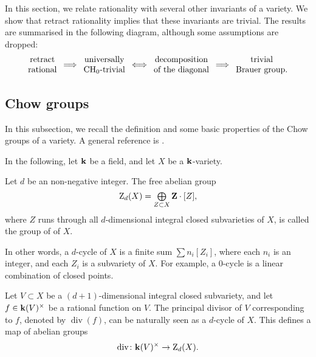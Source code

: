 In this section, we relate
rationality with several other invariants of a variety.
We show that retract rationality implies that 
these invariants are trivial. 
The results are summarised in the following diagram,
although some assumptions are dropped:
\[
    \begin{array}{c}
        \text{retract} \\
        \text{rational}
    \end{array}
    \Longrightarrow
    \begin{array}{c}
        \text{universally} \\
        \text{$\mathrm{CH}_0$-trivial}
    \end{array}
    \Longleftrightarrow
    \begin{array}{c}
        \text{decomposition} \\
        \text{of the diagonal}
    \end{array}
    \Longrightarrow
    \begin{array}{c}
        \text{trivial} \\
        \text{Brauer group.}
    \end{array}
\]


\subsection{Chow groups}

In this subsection, we recall the definition and some basic properties of the Chow groups of a variety.
A general reference is \cite{fulton}.

In the following, let $\bbk$ be a field, and let $X$ be a $\bbk$-variety.

\begin{definition}
    Let $d$ be an non-negative integer.
    The free abelian group
    \[ \textstyle \upZ_d (X) = \bigoplus \limits _{Z \subset X} \bbZ \cdot [Z], \]
    where $Z$ runs through all $d$-dimensional integral closed subvarieties of $X$,
    is called the group of  of $X$.
\end{definition}

In other words, a $d$-cycle of $X$ is a finite sum
$\sum n_i [Z_i]$, where each $n_i$ is an integer,
and each $Z_i$ is a subvariety of $X$.
For example, a $0$-cycle is a linear combination of closed points.

Let $V \subset X$ be a $(d+1)$-dimensional integral closed subvariety, 
and let $f \in \bbk (V) ^\times$ be a rational function on $V$. 
The principal divisor of $V$ corresponding to $f$,
denoted by $\operatorname{div}(f)$, 
can be naturally seen as a $d$-cycle of $X$.
This defines a map of abelian groups
\[ \operatorname{div} \: \bbk (V)^\times \to \upZ_d (X). \]

